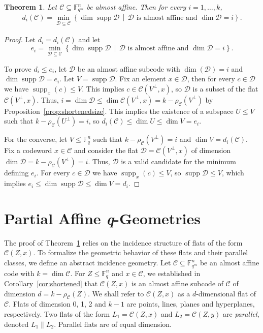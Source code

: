 \documentclass[a4paper,11pt,reqno]{article}
\newcommand{\F}{\mathbb{F}}
\newcommand{\supp}{\operatorname{supp}}
\newcommand{\C}{\mathcal{C}}
\theoremstyle{plain} \numberwithin{equation}{section}
\newtheorem{theorem}{Theorem}[section]
\theoremstyle{definition}
\begin{document}
\begin{theorem} Let $\C\subseteq \F_{q^m}^n$ be almost affine. Then for every $i=1,\ldots,k$,
\begin{align*}
    d_i(\C) = \min_{\mathcal{D}\subseteq \mathcal{C}} \left\{ \dim \supp \mathcal{D} \,\middle|\, \mathcal{D} \text{ is almost affine and $\dim \mathcal{D} = i$} \right\}.
\end{align*} \label{thm:generalizedweights}
\end{theorem}
\begin{proof}
Let $d_i = d_i(\C)$ and let \[
    e_i = \min_{\mathcal{D}\subseteq \mathcal{C}} \left\{ \dim \supp \mathcal{D} \,\middle|\, \mathcal{D} \text{ is almost affine and $\dim \mathcal{D} = i$} \right\}.
\]

To prove $d_i\leq e_i$, let $\mathcal{D}$ be an almost affine subcode with $\dim (\mathcal{D})=i$ and $\dim \supp \mathcal{D} = e_i$. Let $V= \supp \mathcal{D}$. Fix an element $x\in \mathcal{D}$, then for every $c\in \mathcal{D}$ we have $\supp_x(c) \leq V$. This implies $c\in \mathcal{C}(V^\perp,x)$, so $\mathcal{D}$ is a subset of the flat $\C(V^\perp,x)$. Thus, $i = \dim \mathcal{D} \leq \dim \C(V^\perp,x) = k - \rho_\C(V^\perp)$ by Proposition~\ref{prop:shortenedsize}. This implies the existence of a subspace $U\leq V$ such that $k-\rho_\C(U^\perp)=i$, so $d_i(\C) \leq \dim U \leq \dim V = e_i$.

For the converse, let $V\leq \F_q^n$ such that $k - \rho_\C(V^\perp) = i$ and $\dim V = d_i(\C)$. Fix a codeword $x\in \C$ and consider the flat $\mathcal{D} = \C(V^\perp,x)$ of dimension $\dim \mathcal{D} = k-\rho_\C(V^\perp)=i$. Thus, $\mathcal{D}$ is a valid candidate for the minimum defining $e_i$. For every $c\in \mathcal{D}$ we have $\supp_x(c) \leq V$, so $\supp \mathcal{D}\leq V$, which implies $e_i \leq \dim \supp \mathcal{D} \leq \dim V = d_i$.
\end{proof}

\section{Partial Affine \textit{q}-Geometries} \label{sec:geometry}


The proof of Theorem~\ref{thm:generalizedweights} relies on the incidence structure of flats of the form $\mathcal{C}(Z,x)$. To formalize the geometric behavior of these flats and their parallel classes, we define an abstract incidence geometry. Let $\mathcal{C}\subseteq\mathbb{F}_{q^m}^n$ be an almost affine code with $k=\dim\mathcal{C}$. For $Z\le\mathbb{F}_q^n$ and $x\in\mathcal{C}$, we established in Corollary~\ref{cor:shortened} that $\mathcal{C}(Z,x)$ is an almost affine subcode of $\mathcal{C}$ of dimension $d=k-\rho_{\mathcal{C}}(Z)$. We shall refer to $\mathcal{C}(Z,x)$ as a $d$-dimensional flat of $\mathcal{C}$. Flats of dimension 0, 1, 2 and $k-1$ are points, lines, planes and hyperplanes, respectively. Two flats of the form $L_1 = \C(Z,x)$ and $L_2 = \C(Z,y)$ are \emph{parallel}, denoted $L_1 \| L_2$. Parallel flats are of equal dimension.
\end{document}
